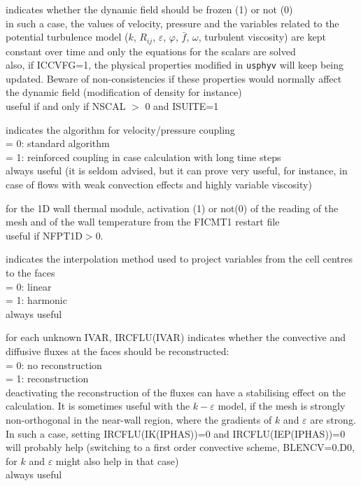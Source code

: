 {indicates whether the dynamic field should be frozen (1) or not (0)\\
in such a case, the values of velocity,
pressure and the variables related to the potential turbulence model
($k$, $R_{ij}$, $\varepsilon$, $\varphi$, $\bar{f}$, $\omega$, turbulent viscosity) are kept
constant over time and only the equations for the scalars are solved\\
also, if ICCVFG=1, the physical properties modified in \texttt{usphyv} will keep
being updated. Beware of non-consistencies if these properties would normally
affect the dynamic field (modification of density for instance)\\
useful if and only if NSCAL $>$ 0 and ISUITE=1}

{indicates the algorithm for velocity/pressure coupling\\
\hspace*{1.3cm}= 0: standard algorithm\\
\hspace*{1.3cm}= 1: reinforced coupling in case calculation with long
time steps\\ 
always useful (it is seldom advised, but it can prove very useful, for instance,
in case of flows with weak convection effects and highly variable viscosity)}

{for the  1D wall thermal module, activation (1) or not(0) of the reading  
of the mesh and of the wall temperature from the FICMT1 restart file\\
useful if NFPT1D$>$0.}

{indicates the interpolation method used to project variables from the cell
centres to the faces\\
\hspace*{1.3cm}= 0: linear\\
\hspace*{1.3cm}= 1: harmonic\\
always useful}

{for each unknown IVAR, IRCFLU(IVAR) indicates whether the convective
and diffusive fluxes at the faces should be reconstructed: \\
\hspace*{1.3cm}= 0: no reconstruction\\
\hspace*{1.3cm}= 1: reconstruction\\
deactivating the reconstruction of the fluxes can have a stabilising effect on
the calculation. It is sometimes useful with the $k-\varepsilon$ model, if the
mesh is strongly non-orthogonal in the near-wall region, where the gradients of
$k$ and $\varepsilon$ are strong. In such a case, setting IRCFLU(IK(IPHAS))=0
and IRCFLU(IEP(IPHAS))=0 will probably help (switching to a first order
convective scheme, BLENCV=0.D0, for $k$ and $\varepsilon$ might also help in
that case)\\
always useful}

